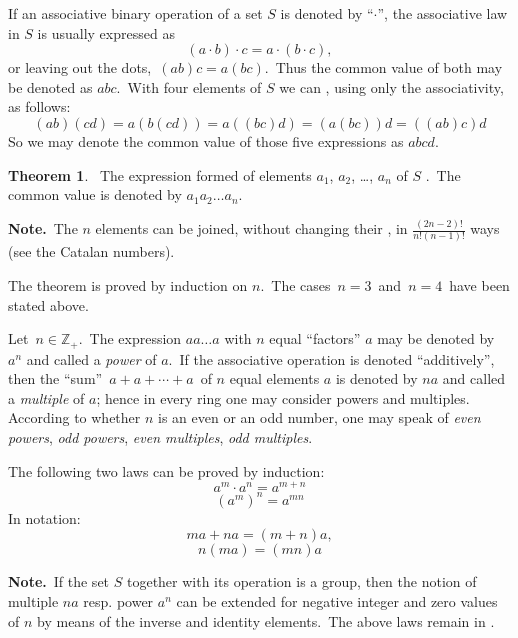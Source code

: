 \documentclass[12pt]{article}
\theoremstyle{definition}
\newtheorem*{thmplain}{Theorem}
\begin{document}
If an associative binary operation of a set $S$ is denoted by ``$\cdot$'', the associative law in $S$ is usually expressed as
  $$(a\!\cdot\!b)\!\cdot\!c = a\!\cdot\!(b\!\cdot\!c),$$
or leaving out the dots,\, $(ab)c = a(bc)$.\, Thus the common value of both  may be denoted as $abc$.\, With four elements of $S$ we can , using only the associativity, as follows:
     $$(ab)(cd) = a(b(cd)) = a((bc)d)= (a(bc))d = ((ab)c)d$$
So we may denote the common value of those five expressions as $abcd$. 

\begin{thmplain}
 \, The expression formed of elements $a_1$, $a_2$, \ldots, $a_n$ of $S$ .\, The common value is denoted by $a_1a_2\ldots a_n$.
\end{thmplain}

\textbf{Note.}\, The $n$ elements can be joined, without changing their , in $\frac{(2n-2)!}{n!(n-1)!}$ ways (see the Catalan numbers).

The theorem is proved by induction on $n$.\, The cases\, $n = 3$\, and\, $n = 4$\, have been stated  above.

Let\, $n \in \mathbb{Z}_+$.\, The expression $aa \ldots a$ with $n$ equal ``factors'' $a$ may be denoted by $a^n$ and called a {\em power} of $a$.\, If the associative operation is denoted ``additively'', then the ``sum''\, 
$a\!+\!a\!+\cdots+\!a$\, of $n$ equal elements $a$ is denoted by $na$ and called a {\em multiple} of $a$; hence in every ring one may consider powers and multiples.  According to whether $n$ is an even or an odd number, one may speak of {\em even powers}, {\em odd powers}, {\em even multiples}, {\em odd multiples}.

The following two laws can be proved by induction:
   $$a^m\cdot a^n = a^{m+n}$$
     $$(a^m)^n = a^{mn}$$
In  notation:
     $$ma\!+\!na = (m\!+\!n)a,$$
      $$n(ma) = (mn)a$$

\textbf{Note.}\, If the set $S$ together with its operation is a group, then the notion of multiple $na$ resp. power $a^n$ can be extended for negative integer and zero values of $n$ by means of the inverse and identity elements.\, The above laws remain in .
\end{document}
